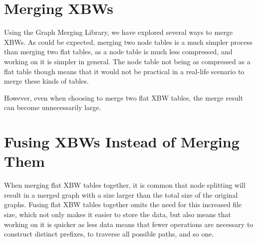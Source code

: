 \documentclass[a4paper,12pt,twoside,BCOR=10mm]{scrbook}
\begin{document}
\section{Merging XBWs}
%

Using the Graph Merging Library, we have explored several ways to merge XBWs. 
As could be expected, merging two node tables is a much simpler process than merging two flat tables, 
as a node table is much less compressed, and working on it is simpler in general. 
The node table not being as compressed as a flat table though means 
that it would not be practical in a real-life scenario to merge these kinds of tables.

However, even when choosing to merge two flat XBW tables, 
the merge result can become unnecessarily large.


\section{Fusing XBWs Instead of Merging Them}
%

When merging flat XBW tables together, it is common that node splitting 
will result in a merged graph with a size larger than the total size of the 
original graphs. 
Fusing flat XBW tables together omits the need for this increased file size, 
which not only makes it easier to store the data, but also means that working on 
it is quicker as less data means that fewer operations are necessary to construct 
distinct prefixes, to traverse all possible paths, and so one.
\end{document}
